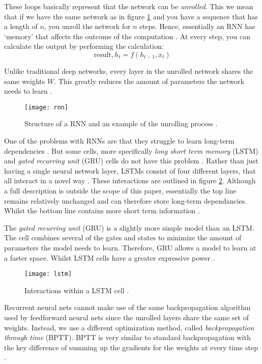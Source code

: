 These loops basically represent that the network can be \textit{unrolled}.
This we mean that if we have the same network as in figure \ref{fig:rnn} and you have a sequence that has a length of $n$, you unroll the network for $n$ steps.
Hence, essentially an RNN has `memory' that affects the outcome of the computation \cite{britz_2016}.
At every step, you can calculate the output by performing the calculation:
$$\text{result}, h_t = f(h_{t - 1}, x_t)$$

Unlike traditional deep networks, every layer in the unrolled network shares the same weights $W$.
This greatly reduces the amount of parameters the network needs to learn \cite{britz_2016}.

\begin{figure}[h]
  \centering
  \texttt{[image: rnn]}
  \caption{Structure of a RNN and an example of the unrolling process \cite{britz_2016}.}
  \label{fig:rnn}
\end{figure}

One of the problems with RNNs are that they struggle to learn long-term dependencies \cite{bengio1994learning}.
But some cells, more specifically \textit{long short term memory} (LSTM) and \textit{gated recurring unit} (GRU) cells do not have this problem \cite{hochreiter1997long,LSTM,cho2014learning}.
Rather than just having a single neural network layer, LSTMs consist of four different layers, that all interact in a novel way \cite{LSTM}.
These interactions are outlined in figure \ref{fig:lstm}.
Although a full description is outside the scope of this paper, essentially the top line remains relatively unchanged and can therefore store long-term dependancies.
Whilst the bottom line contains more short term information \cite{LSTM,hochreiter1997long}.

\newpage

The \textit{gated recurring unit} (GRU) is a slightly more simple model than an LSTM.
The cell combines several of the gates and states to minimize the amount of parameters the model needs to learn.
Therefore, GRU allows a model to learn at a faster space.
Whilst LSTM cells have a greater expressive power \cite{hochreiter1997long,LSTM,cho2014learning}.

\begin{figure}[h]
  \centering
  \texttt{[image: lstm]}
  \caption{Interactions within a LSTM cell \cite{LSTM}.}
  \label{fig:lstm}
\end{figure}

Recurrent neural nets cannot make use of the same backpropagation algorithm used by feedforward neural nets since the unrolled layers share the same set of weights.
Instead, we use a different optimization method, called \textit{backpropagation through time} (BPTT).
BPTT is very similar to standard backpropagation with the key difference of summing up the gradients for the weights at every time step \cite{britz_2016}.

